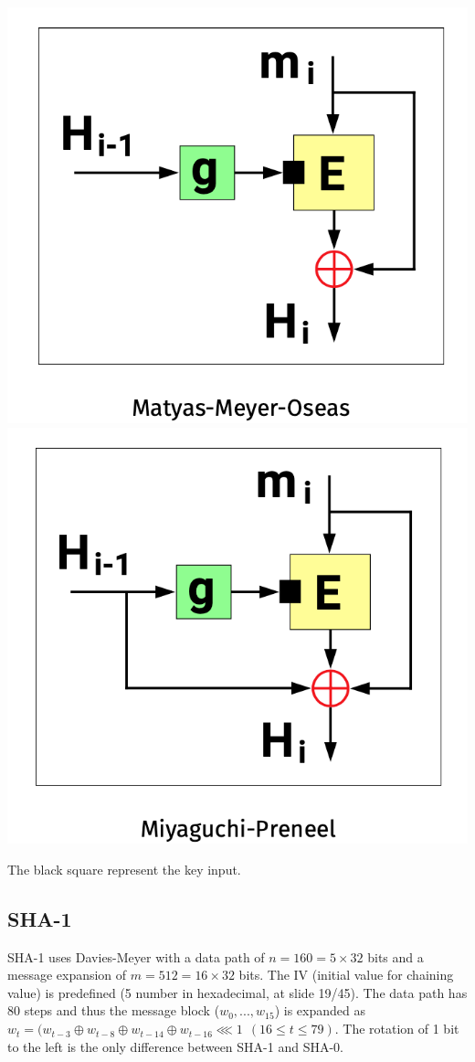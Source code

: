 \documentclass[11pt,a4paper]{report}
\begin{document}
\begin{center}
\includegraphics[scale=0.3]{img/img23.png}
\includegraphics[scale=0.3]{img/img24.png}
\end{center}
The black square represent the key input.

\subsection{SHA-1}
SHA-1 uses Davies-Meyer with a data path of $n = 160 = 5 \times 32$ bits and  a message expansion of $m = 512 = 16 \times 32$ bits. The IV (initial value for chaining value) is predefined (5 number in hexadecimal, at slide 19/45). The data path has 80 steps and thus the message block ($w_0,...,w_{15}$) is expanded as $w_t = (w_{t-3} \oplus w_{t-8} \oplus w_{t-14} \oplus w_{t-16} \lll 1 \ \ (16 \leq t \leq 79)$. The rotation of 1 bit to the left is the only difference between SHA-1 and SHA-0.\\
\end{document}
